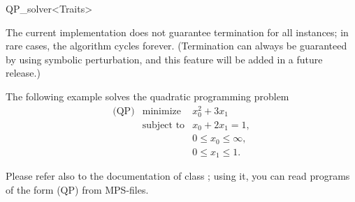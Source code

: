 \begin{ccRefClass}{QP_solver<Traits>}
\ccSeeAlso
%

\ccImplementation
\ccIndexImplementation

The current implementation does not guarantee termination for all
instances; in rare cases, the algorithm cycles forever.  (Termination
can always be guaranteed by using symbolic perturbation, and this
feature will be added in a future release.)

\ccExample

The following example solves the quadratic programming problem
\begin{eqnarray*}
\mbox{(QP)}&\mbox{minimize} & x_0^2 + 3x_1 \\
&\mbox{subject to}   & x_0+2x_1=1, \\
&& 0 \le  x_0 \le \infty, \\
&& 0 \le  x_1 \le 1.
\end{eqnarray*}


Please refer also to the documentation of class
; using it, you can read programs of
the form (QP) from MPS-files.
\end{ccRefClass}


